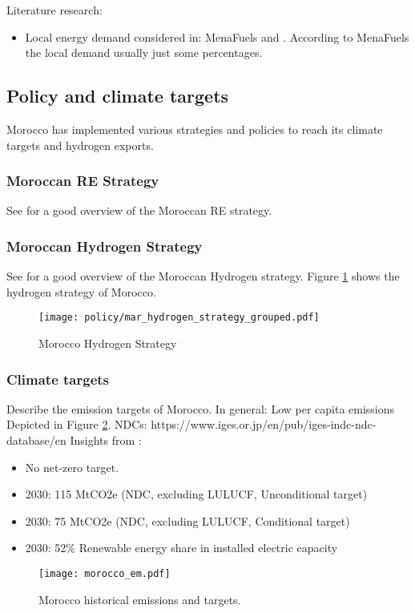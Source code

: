 Literature research:
\begin{itemize}
    \item Local energy demand considered in: MenaFuels and \cite{Hampp2021}. According to MenaFuels the local demand usually just some percentages.
\end{itemize}


\subsection{Policy and climate targets}
Morocco has implemented various strategies and policies to reach its climate targets and hydrogen exports. 

\subsubsection{Moroccan RE Strategy}
See \cite[p. 13]{Ersoy2022} for a good overview of the Moroccan RE strategy.

\subsubsection{Moroccan Hydrogen Strategy}
See \cite[p. 14]{Ersoy2022} for a good overview of the Moroccan Hydrogen strategy. Figure \ref{fig:mar_hydrogen_strategy} shows the hydrogen strategy of Morocco.

\begin{figure}
    \centering
    \texttt{[image: policy/mar\_hydrogen\_strategy\_grouped.pdf]}
    \caption{Morocco Hydrogen Strategy}
    \label{fig:mar_hydrogen_strategy}
\end{figure}

\subsubsection{Climate targets}
Describe the emission targets of Morocco. In general: Low per capita emissions
Depicted in Figure \ref{fig:morocco_em}.
NDCs: https://www.iges.or.jp/en/pub/iges-indc-ndc-database/en 
Insights from \cite{CAT2021}:
\begin{itemize}
    \item No net-zero target.
    \item 2030: 115 MtCO2e (NDC, excluding LULUCF, Unconditional target)
    \item 2030: 75 MtCO2e (NDC, excluding LULUCF, Conditional target)
    \item 2030: 52\% Renewable energy share in installed electric capacity
\end{itemize}

\begin{figure}[h!]
    \centering
    \texttt{[image: morocco\_em.pdf]}
    \caption{Morocco historical emissions and targets.}
    \label{fig:morocco_em}
\end{figure}